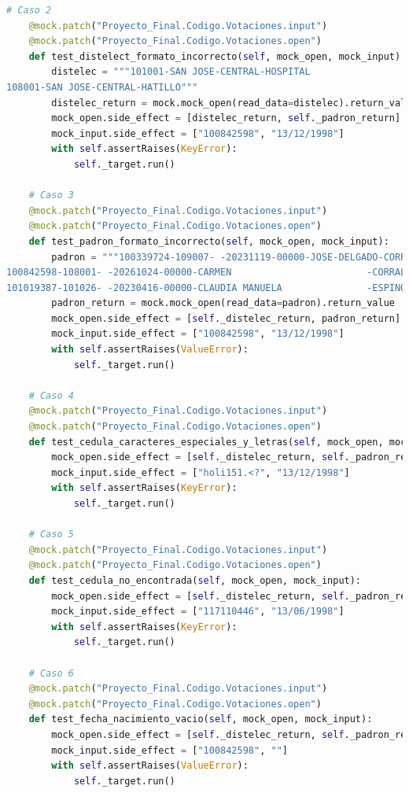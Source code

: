 \documentclass[conference]{IEEEtran}
\begin{document}
\begin{lstlisting}[language=Python, basicstyle=\tiny, breaklines=true,
    postbreak=\mbox{\textcolor{red}{$\hookrightarrow$}\space}]
    # Caso 2
    @mock.patch("Proyecto_Final.Codigo.Votaciones.input")
    @mock.patch("Proyecto_Final.Codigo.Votaciones.open")
    def test_distelect_formato_incorrecto(self, mock_open, mock_input):
        distelec = """101001-SAN JOSE-CENTRAL-HOSPITAL
108001-SAN JOSE-CENTRAL-HATILLO"""
        distelec_return = mock.mock_open(read_data=distelec).return_value
        mock_open.side_effect = [distelec_return, self._padron_return]
        mock_input.side_effect = ["100842598", "13/12/1998"]
        with self.assertRaises(KeyError):
            self._target.run()

    # Caso 3
    @mock.patch("Proyecto_Final.Codigo.Votaciones.input")
    @mock.patch("Proyecto_Final.Codigo.Votaciones.open")
    def test_padron_formato_incorrecto(self, mock_open, mock_input):
        padron = """100339724-109007- -20231119-00000-JOSE-DELGADO-CORRALES         
100842598-108001- -20261024-00000-CARMEN                        -CORRALES                  -MORALES           
101019387-101026- -20230416-00000-CLAUDIA MANUELA               -ESPINOZA                  -FONSECA"""
        padron_return = mock.mock_open(read_data=padron).return_value
        mock_open.side_effect = [self._distelec_return, padron_return]
        mock_input.side_effect = ["100842598", "13/12/1998"]
        with self.assertRaises(ValueError):
            self._target.run()

    # Caso 4
    @mock.patch("Proyecto_Final.Codigo.Votaciones.input")
    @mock.patch("Proyecto_Final.Codigo.Votaciones.open")
    def test_cedula_caracteres_especiales_y_letras(self, mock_open, mock_input):
        mock_open.side_effect = [self._distelec_return, self._padron_return]
        mock_input.side_effect = ["holi151.<?", "13/12/1998"]
        with self.assertRaises(KeyError):
            self._target.run()

    # Caso 5
    @mock.patch("Proyecto_Final.Codigo.Votaciones.input")
    @mock.patch("Proyecto_Final.Codigo.Votaciones.open")
    def test_cedula_no_encontrada(self, mock_open, mock_input):
        mock_open.side_effect = [self._distelec_return, self._padron_return]
        mock_input.side_effect = ["117110446", "13/06/1998"]
        with self.assertRaises(KeyError):
            self._target.run()

    # Caso 6
    @mock.patch("Proyecto_Final.Codigo.Votaciones.input")
    @mock.patch("Proyecto_Final.Codigo.Votaciones.open")
    def test_fecha_nacimiento_vacio(self, mock_open, mock_input):
        mock_open.side_effect = [self._distelec_return, self._padron_return]
        mock_input.side_effect = ["100842598", ""]
        with self.assertRaises(ValueError):
            self._target.run()


\end{lstlisting}
\end{document}
